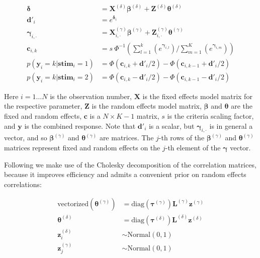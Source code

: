 \documentclass[oneside,a4paper]{article}
\begin{document}
\begin{align*}
  \bm{\delta} &= \bm{X}^{(\delta)} \bm{\beta}^{(\delta)} + \bm{Z}^{(\delta)} \bm{\theta}^{(\delta)} \\
  \bm{d'}_i &= e^{\bm{\delta}_i} \\
  \bm{\gamma}_{i,\cdot} &= \bm{X}^{(\gamma)}_{i,\cdot} \bm{\beta}^{(\gamma)} + \bm{Z}^{(\gamma)}_{i,\cdot}
                      \bm{\theta}^{(\gamma)} \\
  \bm{c}_{i,k} &= s \ \Phi^{-1}(\sum_{l = 1}^k(e^{\bm{\gamma}_{i,l}}) /
                 \sum_{m=1}^K(e^{\bm{\gamma}_{i,m}})) \\
  p(\bm{y}_i = k|\bm{stim}_i = 1) &= \Phi(\bm{c}_{i,k} + \bm{d'}_i / 2) - \Phi(\bm{c}_{i,k-1} + \bm{d'}_i / 2) \\
  p(\bm{y}_i = k|\bm{stim}_i = 2) &= \Phi(\bm{c}_{i,k} - \bm{d'}_i / 2) - \Phi(\bm{c}_{i,k-1} - \bm{d'}_i / 2)
\end{align*}

\noindent Here $i = 1\dots N$ is the observation number, $\bm{X}$ is
the fixed effects model matrix for the respective parameter, $\bm{Z}$
is the random effects model matrix, $\bm{\beta}$ and $\bm{\theta}$ are
the
fixed and random effects, $\bm{c}$ is a $N \times K-1$ matrix, $s$ is
the criteria scaling factor, and $\bm{y}$ is the combined
response. Note that $\bm{d'}_i$ is a scalar, but
$\bm{\gamma}_{i,\cdot}$ is in general a vector, and so
$\bm{\beta}^{(\gamma)}$ and $\bm{\theta}^{(\gamma)}$ are matrices. The
$j$-th rows of the $\bm{\beta}^{(\gamma)}$ and
$\bm{\theta}^{(\gamma)}$ matrices
represent fixed and random effects on the $j$-th element of the
$\bm{\gamma}$ vector.

Following  we make use of the Cholesky
decomposition of the correlation matrices, because it improves
efficiency and admits a convenient prior on random effects
correlations:

\begin{align*}
  \text{vectorized}(\bm{\theta}^{(\gamma)}) &= \text{diag}(\bm{\tau}^{(\gamma)}) \bm{L}^{(\gamma)} \bm{z}^{(\gamma)} \\
  \bm{\theta}^{(\delta)} &= \text{diag}(\bm{\tau}^{(\delta)}) \bm{L}^{(\delta)} \bm{z}^{(\delta)} \\
  \bm{z}^{(\delta)}_i &\sim \text{Normal}(0, 1) \\
  \bm{z}^{(\gamma)}_j &\sim \text{Normal}(0, 1)
\end{align*}
\end{document}
